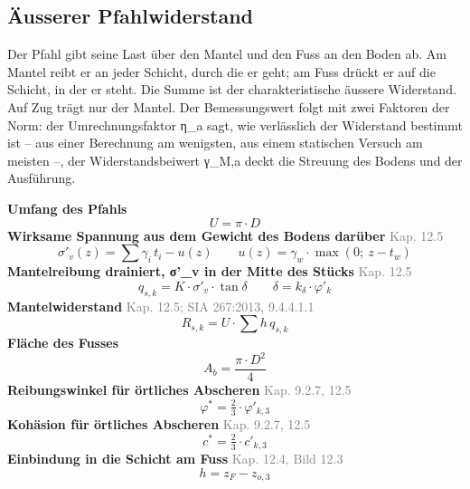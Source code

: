 \documentclass[11pt,a4paper]{article}
\newcommand{\normref}[1]{{\small\textcolor{gray}{#1}}}
\begin{document}
\subsection{Äusserer Pfahlwiderstand}
Der Pfahl gibt seine Last über den Mantel und den Fuss an den Boden ab. Am Mantel reibt er an jeder Schicht, durch die er geht; am Fuss drückt er auf die Schicht, in der er steht. Die Summe ist der charakteristische äussere Widerstand. Auf Zug trägt nur der Mantel. Der Bemessungswert folgt mit zwei Faktoren der Norm: der Umrechnungsfaktor η\_a sagt, wie verlässlich der Widerstand bestimmt ist -- aus einer Berechnung am wenigsten, aus einem statischen Versuch am meisten --, der Widerstandsbeiwert γ\_M,a deckt die Streuung des Bodens und der Ausführung.

\noindent\textbf{Umfang des Pfahls}
\begin{equation*}
U = \pi \cdot D
\end{equation*}
\noindent\textbf{Wirksame Spannung aus dem Gewicht des Bodens darüber} \hfill \normref{Kap. 12.5}
\begin{equation*}
\sigma'_v(z) = \sum \gamma_i \, t_i - u(z) \qquad u(z) = \gamma_w \cdot \max\left(0;\ z - t_w\right)
\end{equation*}
\noindent\textbf{Mantelreibung drainiert, σ'\_v in der Mitte des Stücks} \hfill \normref{Kap. 12.5}
\begin{equation*}
q_{s,k} = K \cdot \sigma'_v \cdot \tan\delta \qquad \delta = k_{\delta} \cdot \varphi'_k
\end{equation*}
\noindent\textbf{Mantelwiderstand} \hfill \normref{Kap. 12.5; SIA 267:2013, 9.4.4.1.1}
\begin{equation*}
R_{s,k} = U \cdot \sum h \, q_{s,k}
\end{equation*}
\noindent\textbf{Fläche des Fusses}
\begin{equation*}
A_b = \frac{\pi \cdot D^{2}}{4}
\end{equation*}
\noindent\textbf{Reibungswinkel für örtliches Abscheren} \hfill \normref{Kap. 9.2.7, 12.5}
\begin{equation*}
\varphi^{*} = \tfrac{2}{3} \cdot \varphi'_{k,3}
\end{equation*}
\noindent\textbf{Kohäsion für örtliches Abscheren} \hfill \normref{Kap. 9.2.7, 12.5}
\begin{equation*}
c^{*} = \tfrac{2}{3} \cdot c'_{k,3}
\end{equation*}
\noindent\textbf{Einbindung in die Schicht am Fuss} \hfill \normref{Kap. 12.4, Bild 12.3}
\begin{equation*}
h = z_F - z_{o,3}
\end{equation*}
\end{document}
